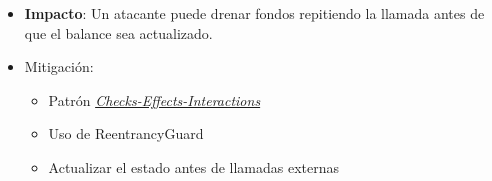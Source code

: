 \begin{Shaded}
\begin{Highlighting}[]

    \KeywordTok{=\textgreater{}}\OperatorTok{;}

     \NormalTok{() }

\NormalTok{        balances[msg}\NormalTok{] }\OperatorTok{+=}\OperatorTok{;}

\NormalTok{    \}}

     \NormalTok{ \{}

        \NormalTok{(balances[msg}\NormalTok{] }\OperatorTok{\textgreater{}=}\OperatorTok{;}

\FunctionTok{       }\OperatorTok{,}\NormalTok{ ) }\OperatorTok{=}\NormalTok{\{}\OperatorTok{:}\NormalTok{)}\OperatorTok{;}

        \OperatorTok{;}

\NormalTok{        balances[msg}\NormalTok{] }\OperatorTok{{-}=}\OperatorTok{;}

\NormalTok{    \}}

\NormalTok{\}}
\end{Highlighting}
\end{Shaded}

\begin{itemize}
\tightlist
\item
  \textbf{Impacto}: Un atacante puede drenar fondos repitiendo la
  llamada antes de que el balance sea actualizado.
\item
  Mitigación:

  \begin{itemize}
  \tightlist
  \item
    Patrón
    \href{https://fravoll.github.io/solidity-patterns/checks_effects_interactions.html}{\emph{Checks-Effects-Interactions}}
  \item
    Uso de ReentrancyGuard
  \item
    Actualizar el estado antes de llamadas externas
  \end{itemize}
\end{itemize}


